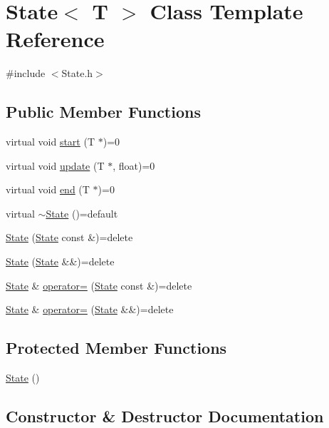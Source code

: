 \hypertarget{class_state}{}\section{State$<$ T $>$ Class Template Reference}
\label{class_state}


{\ttfamily \#include $<$State.\+h$>$}

\subsection*{Public Member Functions}
\begin{DoxyCompactItemize}
\item 
virtual void \hyperlink{class_state_abc29d36b0462a306ac9b32f36571d783}{start} (T $\ast$)=0
\item 
virtual void \hyperlink{class_state_a30b5f87ed3e3a05fafeaf898e43518ea}{update} (T $\ast$, float)=0
\item 
virtual void \hyperlink{class_state_a97d058722f988c008e912a0e5ec879b3}{end} (T $\ast$)=0
\item 
virtual \hyperlink{class_state_a51d777e7c1b39124485c054e23bef907}{$\sim$\+State} ()=default
\item 
\hyperlink{class_state_af2011c359fcd894caa8808267214476d}{State} (\hyperlink{class_state}{State} const \&)=delete
\item 
\hyperlink{class_state_aea2dbf8f9a48af8f95059cbbef0234e0}{State} (\hyperlink{class_state}{State} \&\&)=delete
\item 
\hyperlink{class_state}{State} \& \hyperlink{class_state_a9bfd3ed38091f3ac91f58cd379b0b67d}{operator=} (\hyperlink{class_state}{State} const \&)=delete
\item 
\hyperlink{class_state}{State} \& \hyperlink{class_state_a7fcc843d742907e0b8e29e619fd95b27}{operator=} (\hyperlink{class_state}{State} \&\&)=delete
\end{DoxyCompactItemize}
\subsection*{Protected Member Functions}
\begin{DoxyCompactItemize}
\item 
\hyperlink{class_state_a36b8d88556e052c69379bf7813396c21}{State} ()
\end{DoxyCompactItemize}


\subsection{Constructor \& Destructor Documentation}
\mbox{\label{class_state_a51d777e7c1b39124485c054e23bef907}} 
